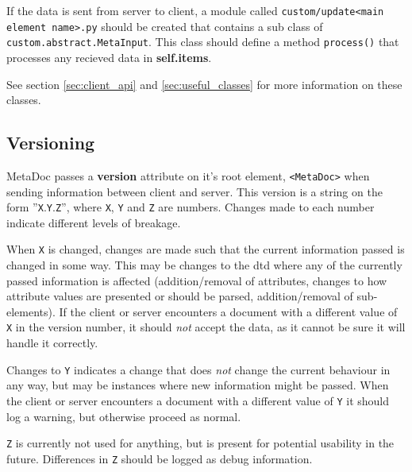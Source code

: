 If the data is sent from server to client, a module called
\texttt{custom/update<main element name>.py} should be created that contains a
sub class of \\ \texttt{custom.abstract.MetaInput}. This class should define a
method \texttt{process()} that processes any recieved data in
\textbf{self.items}.  

See section \ref{sec:client_api} and \ref{sec:useful_classes} for more
information on these classes.


\subsection{Versioning}
\label{sec:version}
MetaDoc passes a \textbf{version} attribute on it's root element,
\texttt{<MetaDoc>} when sending information between client and server. This
version is a string on the form ''\texttt{X}.\texttt{Y}.\texttt{Z}'', where
\texttt{X}, \texttt{Y} and \texttt{Z} are numbers. Changes made to each number 
indicate different levels of breakage. 

When \texttt{X} is changed, changes are made such that the current information
passed is changed in some way. This may be changes to the \gls{dtd} where any
of the currently passed information is affected (addition/removal of
attributes, changes to how attribute values are presented or should be parsed,
addition/removal of sub-elements). If the client or server encounters a
document with a different value of \texttt{X} in the version number, it should
\textit{not} accept the data, as it cannot be sure it will handle it correctly.

Changes to \texttt{Y} indicates a change that does \textit{not} change the
current behaviour in any way, but may be instances where new information might
be passed. When the client or server encounters a document with a different
value of \texttt{Y} it should log a warning, but otherwise proceed as normal.

\texttt{Z} is currently not used for anything, but is present for potential
usability in the future. Differences in \texttt{Z} should be logged as debug
information.
